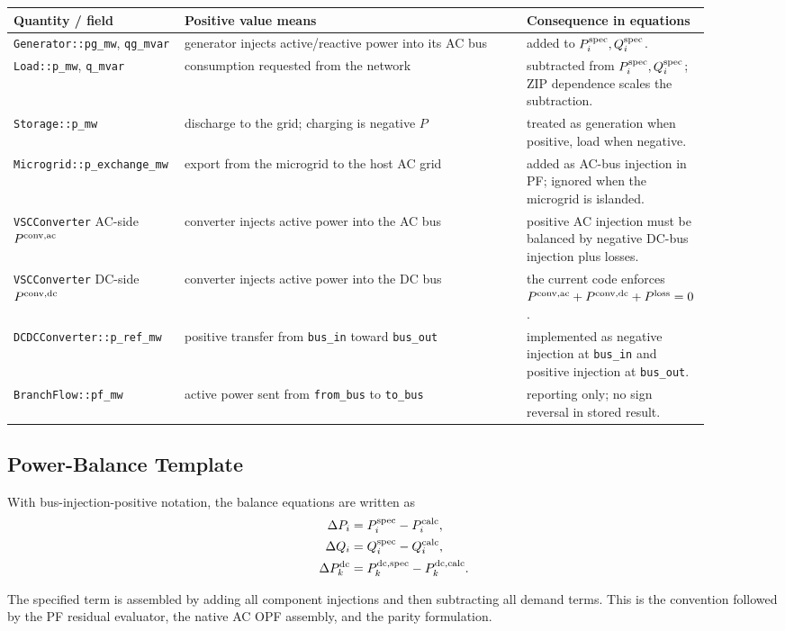 \begin{longtable}{L{0.24\linewidth}L{0.48\linewidth}L{0.18\linewidth}}
\toprule
Quantity / field & Positive value means & Consequence in equations \\
\midrule
\endhead
\texttt{Generator::pg\_mw}, \texttt{qg\_mvar} & generator injects active/reactive power into its AC bus & added to \(P_i^{\mathrm{spec}}, Q_i^{\mathrm{spec}}\). \\
\texttt{Load::p\_mw}, \texttt{q\_mvar} & consumption requested from the network & subtracted from \(P_i^{\mathrm{spec}}, Q_i^{\mathrm{spec}}\); ZIP dependence scales the subtraction. \\
\texttt{Storage::p\_mw} & discharge to the grid; charging is negative \(P\) & treated as generation when positive, load when negative. \\
\texttt{Microgrid::p\_exchange\_mw} & export from the microgrid to the host AC grid & added as AC-bus injection in PF; ignored when the microgrid is islanded. \\
\texttt{VSCConverter} AC-side \(P^{\mathrm{conv,ac}}\) & converter injects active power into the AC bus & positive AC injection must be balanced by negative DC-bus injection plus losses. \\
\texttt{VSCConverter} DC-side \(P^{\mathrm{conv,dc}}\) & converter injects active power into the DC bus & the current code enforces \(P^{\mathrm{conv,ac}}+P^{\mathrm{conv,dc}}+P^{\mathrm{loss}}=0\). \\
\texttt{DCDCConverter::p\_ref\_mw} & positive transfer from \texttt{bus\_in} toward \texttt{bus\_out} & implemented as negative injection at \texttt{bus\_in} and positive injection at \texttt{bus\_out}. \\
\texttt{BranchFlow::pf\_mw} & active power sent from \texttt{from\_bus} to \texttt{to\_bus} & reporting only; no sign reversal in stored result. \\
\bottomrule
\end{longtable}

\subsection{Power-Balance Template}

With bus-injection-positive notation, the balance equations are written as
\begin{align}
\Delta P_i &= P_i^{\mathrm{spec}} - P_i^{\mathrm{calc}}, \\
\Delta Q_i &= Q_i^{\mathrm{spec}} - Q_i^{\mathrm{calc}}, \\
\Delta P_k^{\mathrm{dc}} &= P_k^{\mathrm{dc,spec}} - P_k^{\mathrm{dc,calc}}.
\end{align}

The specified term is assembled by adding all component injections and then
subtracting all demand terms.  This is the convention followed by the PF
residual evaluator, the native AC OPF assembly, and the parity formulation.
